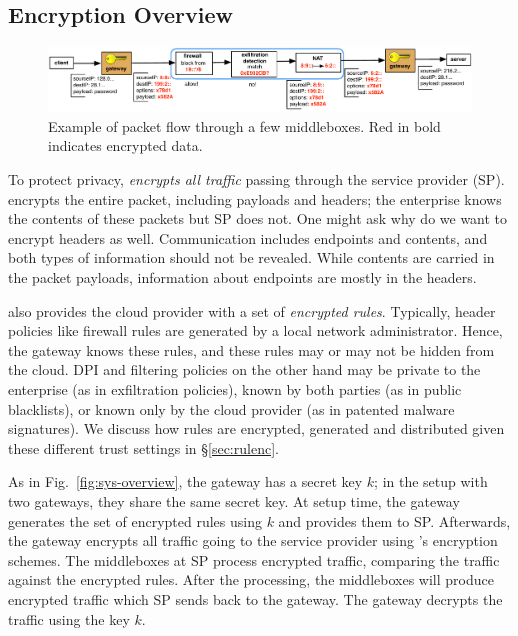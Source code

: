 \subsection{Encryption Overview}

\begin{figure}[t!]
\begin{center}
  \includegraphics[width=6.7in]{fig/packetpath.pdf}
\caption{Example of packet flow through a few middleboxes. Red in bold indicates encrypted data. \label{fig:packetflow}}
\end{center}
\end{figure}

To protect privacy, \sys \textit{encrypts all traffic} passing through the service provider (SP).
\sys encrypts the entire packet, including payloads and headers; the enterprise knows the contents of these packets but SP does not. One might ask why do we want to encrypt headers as well. Communication includes endpoints and contents, and both types of information should not be revealed. While contents are carried in the packet payloads, information about endpoints are mostly in the headers. 

\sys also provides the cloud provider with a set of {\it encrypted rules}.
Typically, header policies like firewall rules are generated by a local network administrator. Hence, the gateway knows these rules, and these rules may or may not be hidden from the cloud.
DPI and filtering policies on the other hand may be private to the enterprise (as in exfiltration policies), known by both parties (as in  public blacklists), or known only by the cloud provider (as in  patented malware signatures).
We discuss how rules are encrypted, generated and distributed given these different trust settings in \S\ref{sec:rulenc}.

As in Fig.~\ref{fig:sys-overview}, the gateway has a secret key $k$; in the setup with two gateways, they share
the same secret key. 
At setup time, the gateway generates the set of encrypted rules using $k$ and provides them to SP.
Afterwards, the gateway encrypts all traffic going to the service provider using \sys's encryption schemes.
The middleboxes at SP process  encrypted traffic, comparing the traffic against the encrypted rules. 
After the processing, the middleboxes
will produce encrypted traffic which SP sends back to the gateway. The gateway decrypts the traffic using the key $k$.

